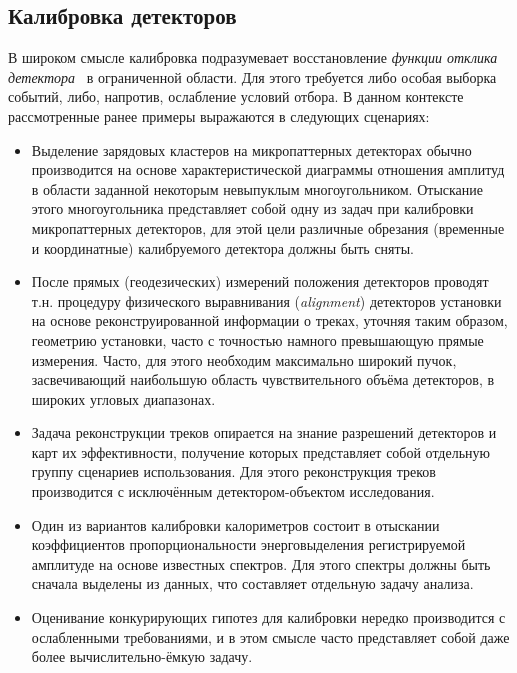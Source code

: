 \subsection{Калибровка детекторов}

В широком смысле калибровка подразумевает восстановление \emph{функции отклика детектора}~\cite{exp-methods-Abramov1977} в ограниченной области. Для этого требуется либо особая выборка событий, либо, напротив, ослабление условий отбора.
В данном контексте рассмотренные ранее примеры выражаются в следующих
сценариях:

\begin{itemize}
    \item Выделение зарядовых кластеров на микропаттерных детекторах
    обычно производится на основе характеристической диаграммы
    отношения амплитуд в области заданной
    некоторым невыпуклым многоугольником. Отыскание этого
    многоугольника представляет собой одну из задач при калибровки
    микропаттерных детекторов, для этой цели различные обрезания
    (временные и координатные) калибруемого детектора должны быть сняты.
    \item После прямых (геодезических) измерений положения детекторов проводят
    т.н. процедуру физического выравнивания (\emph{alignment})
    детекторов установки на основе реконструированной информации о
    треках, уточняя таким образом, геометрию установки, часто с точностью
    намного превышающую прямые измерения. Часто, для этого необходим
    максимально широкий пучок, засвечивающий наибольшую область
    чувствительного объёма детекторов, в широких угловых диапазонах.
    \item Задача реконструкции треков опирается на знание разрешений
    детекторов и карт их эффективности, получение которых представляет
    собой отдельную группу сценариев использования. Для этого реконструкция
    треков производится с исключённым детектором-объектом исследования.
    \item Один из вариантов калибровки калориметров состоит в отыскании
    коэффициентов пропорциональности энерговыделения регистрируемой амплитуде
    на основе известных спектров. Для этого спектры должны быть сначала
    выделены из данных, что составляет отдельную задачу анализа.
    \item Оценивание конкурирующих гипотез для калибровки нередко
    производится с ослабленными требованиями, и в этом смысле часто
    представляет собой даже более вычислительно-ёмкую задачу.
\end{itemize}

